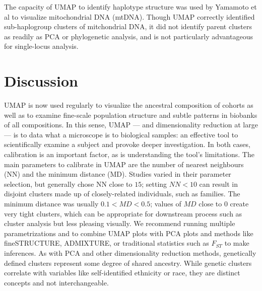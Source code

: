 The capacity of UMAP to identify haplotype structure was used by Yamamoto et al to visualize mitochondrial DNA (mtDNA). Though UMAP correctly identified sub-haplogroup clusters of mitchondrial DNA, it did not identify parent clusters as readily as PCA or phylogenetic analysis, and is not particularly advantageous for single-locus analysis\citep{yamamoto_genetic_2020}. 

\section{Discussion}
UMAP is now used regularly to visualize the ancestral composition of cohorts as well as to examine fine-scale population structure and subtle patterns in biobanks of all compositions. In this sense, UMAP --- and dimensionality reduction at large --- is to data what a microscope is to biological samples: an effective tool to scientifically examine a subject and provoke deeper investigation. In both cases, calibration is an important factor, as is understanding the tool's limitations. The main parameters to calibrate in UMAP are the number of nearest neighbours (NN) and the minimum distance (MD). Studies varied in their parameter selection, but generally chose NN close to $15$; setting $NN < 10$ can result in disjoint clusters made up of closely-related individuals, such as families. The minimum distance was usually $0.1 < MD < 0.5$; values of $MD$ close to $0$ create very tight clusters, which can be appropriate for  downstream process such as cluster analysis but less pleasing visually. We recommend running multiple parametrizations and to combine UMAP plots with PCA plots and methods like fineSTRUCTURE\citep{lawson2012inference}, ADMIXTURE\citep{alexander2009fast}, or traditional statistics such as $F_{ST}$ to make inferences. As with PCA and other dimensionality reduction methods, genetically defined clusters represent some degree of shared ancestry. While genetic clusters correlate with variables like self-identified ethnicity or race, they are distinct concepts and not interchangeable\citep{mathieson_what_2020}.

